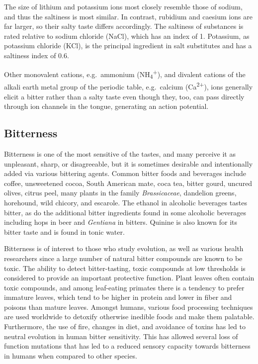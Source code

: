 The size of lithium and potassium ions most closely resemble those of sodium, and thus the saltiness is most similar. In contrast, rubidium and caesium ions are far larger, so their salty taste differs accordingly. The saltiness of substances is rated relative to sodium chloride (NaCl), which has an index of 1. Potassium, as potassium chloride (KCl), is the principal ingredient in salt substitutes and has a saltiness index of 0.6.

Other monovalent cations, e.g.~ammonium (NH\textsubscript{4}\textsuperscript{+}), and divalent cations of the alkali earth metal group of the periodic table, e.g.~calcium (Ca\textsuperscript{2+}), ions generally elicit a bitter rather than a salty taste even though they, too, can pass directly through ion channels in the tongue, generating an action potential.

\hypertarget{bitterness}{%
\subsection{Bitterness}\label{bitterness}}

Bitterness is one of the most sensitive of the tastes, and many perceive it as unpleasant, sharp, or disagreeable, but it is sometimes desirable and intentionally added via various bittering agents. Common bitter foods and beverages include coffee, unsweetened cocoa, South American mate, coca tea, bitter gourd, uncured olives, citrus peel, many plants in the family \emph{Brassicaceae}, dandelion greens, horehound, wild chicory, and escarole. The ethanol in alcoholic beverages tastes bitter, as do the additional bitter ingredients found in some alcoholic beverages including hops in beer and \emph{Gentiana} in bitters. Quinine is also known for its bitter taste and is found in tonic water.

Bitterness is of interest to those who study evolution, as well as various health researchers since a large number of natural bitter compounds are known to be toxic. The ability to detect bitter-tasting, toxic compounds at low thresholds is considered to provide an important protective function. Plant leaves often contain toxic compounds, and among leaf-eating primates there is a tendency to prefer immature leaves, which tend to be higher in protein and lower in fiber and poisons than mature leaves. Amongst humans, various food processing techniques are used worldwide to detoxify otherwise inedible foods and make them palatable. Furthermore, the use of fire, changes in diet, and avoidance of toxins has led to neutral evolution in human bitter sensitivity. This has allowed several loss of function mutations that has led to a reduced sensory capacity towards bitterness in humans when compared to other species.

